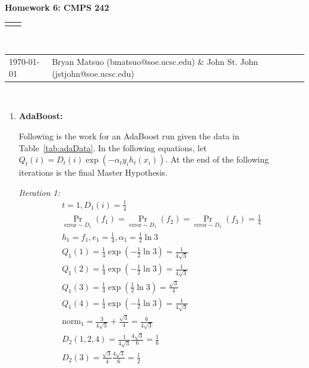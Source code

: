 \documentclass[12pt]{article}
\renewcommand{\title}[1]{\textbf{#1}\\}
\renewcommand{\line}{\begin{tabularx}{\textwidth}{X>{\raggedleft}X}\hline\\\end{tabularx}\\[-0.5cm]}
\newcommand{\leftright}[2]{\begin{tabularx}{\textwidth}{X>{\raggedleft}X}#1%
& #2\\\end{tabularx}\\[-0.5cm]}
\begin{document}
\title{Homework 6: CMPS 242}
\line
\leftright{\today}{Bryan Matsuo (bmatsuo@soe.ucsc.edu) \& John St. John (jstjohn@soe.ucsc.edu)} %
\begin{enumerate}
\item \textbf{AdaBoost:}

Following is the work for an AdaBoost run given the data in Table~\ref{tab:adaData}. In the following equations, let $Q_t(i) = D_t(i) \exp(-\alpha_t y_i h_t(x_i))$. At the end of the following iterations is the final Master Hypothesis.

\textit{ Iteration 1:}
\begin{eqnarray*}
t=1, D_1(i) = \frac{1}{4} \\
\Pr_{\text{error} \sim D_1}\left(f_1\right) = \Pr_{\text{error} \sim D_1}\left(f_2\right)= \Pr_{\text{error} \sim D_1}\left(f_3\right) = \frac{1}{4} \\
h_1 = f_1, e_1 = \frac{1}{4}, \alpha_1 = \frac{1}{2} \ln 3 \\
Q_1(1) = \frac{1}{4} \exp \left( -\frac{1}{2}  \ln 3 \right) = \frac{1}{4\sqrt{3}} \\
Q_1(2) = \frac{1}{4} \exp \left( -\frac{1}{2}  \ln 3 \right) = \frac{1}{4\sqrt{3}} \\
Q_1(3) = \frac{1}{4} \exp \left( \frac{1}{2}  \ln 3 \right) =\frac{\sqrt{3}}{4}\\
Q_1(4) = \frac{1}{4} \exp \left( -\frac{1}{2}  \ln 3 \right)= \frac{1}{4\sqrt{3}}  \\
\text{norm}_1 = \frac{3}{4\sqrt{3}} + \frac{\sqrt{3}}{4} = \frac{6}{4\sqrt{3}} \\
D_2(1,2,4) = \frac{1}{4\sqrt{3}} \frac{4\sqrt{3}}{6} = \frac{1}{6}\\
D_2(3) = \frac{\sqrt{3}}{4}\frac{4\sqrt{3}}{6} = \frac{1}{2}
\end{eqnarray*}


\end{enumerate}
\end{document}
